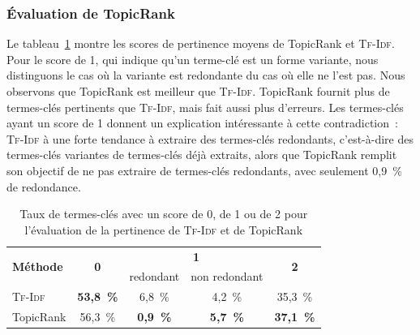       \subsubsection{Évaluation de TopicRank}
      \label{subsubsec:main-domain_specific_keyphrase_annotation-manual_evaluation-analysis-topicrank}
        Le
        tableau~\ref{tab:main-automatic_evaluation_of_keyphrase_annotation-results-topicrank-pertinence_score_ratio}
        montre les scores de pertinence moyens de TopicRank et \textsc{Tf-Idf}. Pour le score
        de 1, qui indique qu'un terme-clé est un forme variante, nous
        distinguons le cas où la variante est redondante du cas où elle ne l'est
        pas. Nous observons que TopicRank est meilleur que
        \textsc{Tf-Idf}. TopicRank fournit plus de termes-clés pertinents que
        \textsc{Tf-Idf}, mais fait aussi plus d'erreurs. Les termes-clés ayant
        un score de 1 donnent un explication intéressante à cette
        contradiction~: \textsc{Tf-Idf} à une forte tendance à extraire des
        termes-clés redondants, c'est-à-dire des termes-clés variantes de
        termes-clés déjà extraits, alors que TopicRank remplit son
        objectif de ne pas extraire de termes-clés redondants, avec seulement
        0,9~\% de redondance.
        \begin{table}[h!]
          \centering
          \begin{tabular}{l|c|c|c|c}
            \toprule
            \multirow{2}{*}{\textbf{Méthode}} & \multirow{2}{*}{\textbf{0}} & \multicolumn{2}{c|}{\textbf{1}} & \multirow{2}{*}{\textbf{2}}\\
            \cline{3-4}
            & & \multicolumn{1}{p{.175\linewidth}|}{\centering{}redondant} & \multicolumn{1}{p{.175\linewidth}|}{\centering{}non redondant} &\\
            \hline
            \textsc{Tf-Idf} & \textbf{53,8~\%} & 6,8~\% & 4,2~\% & 35,3~\%\\
            TopicRank & 56,3~\% & \textbf{0,9~\%} & \textbf{5,7~\%} & \textbf{37,1~\%}\\
            \bottomrule
          \end{tabular}
          \caption{Taux de termes-clés avec un score de 0, de 1 ou de 2 pour
                   l'évaluation de la pertinence de \textsc{Tf-Idf} et de
                   TopicRank
                   \label{tab:main-automatic_evaluation_of_keyphrase_annotation-results-topicrank-pertinence_score_ratio}}
        \end{table}

